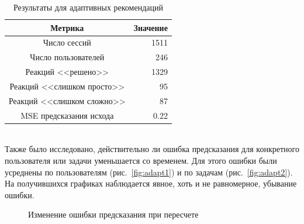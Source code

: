 \documentclass[14pt]{matmex-diploma}
\begin{document}
\begin{table}[h]
    \caption{Результаты для адаптивных рекомендаций}
    \label{tabular:table_adaptive}
    \begin{center}
    \begin{tabular}{ c | r }
      \hline
      Метрика & Значение \\
      \hline
      \hline
      Число сессий & 1511 \\
      Число пользователей & 246 \\
      Реакций <<решено>> & 1329 \\
      Реакций <<слишком просто>> & 95 \\ 
      Реакций <<слишком сложно>> & 87 \\
      MSE предсказания исхода & 0.22 \\
     \hline  
    \end{tabular}
    \end{center}
\end{table}

\\\indent Также было исследовано, действительно ли ошибка предсказания для конкретного пользователя или задачи уменьшается со временем. Для этого ошибки были усреднены по пользователям (рис.~\ref{fig:adapt1}) и по задачам (рис.~\ref{fig:adapt2}). На получившихся графиках наблюдается явное, хоть и не равномерное, убывание ошибки.


\begin{figure}[h]
  \centering
  \hfill
    \caption{Изменение ошибки предсказания при пересчете}
    \label{fig:adaptive_errors}
\end{figure}
\end{document}
